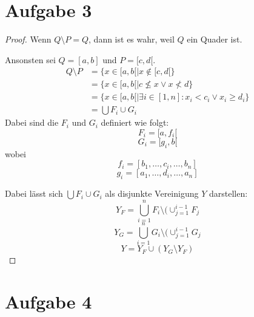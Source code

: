 \documentclass[10pt,a4paper]{article}
\begin{document}
\section{Aufgabe 3}
\begin{proof}
  Wenn $Q \setminus P = Q$, dann ist es wahr, weil $Q$ ein Quader ist.

  Ansonsten sei $Q = [a, b]$ und $P = [c, d[$.
  \begin{align*}
    Q \setminus P & = \{ x \in [a, b[ \mid x \notin [c, d[ \}\\
    & = \{ x \in [a, b[ \mid c \nleq x \lor x \nless d \}\\
    & = \{ x \in [a, b[ \mid \exists i \in [1, n]: x_{i} < c_{i} \lor x_{i} \geq d_{i} \}\\
    & = \bigcup F_{i} \cup G_{i}
  \end{align*}
  Dabei sind die $F_{i}$ und $G_{i}$ definiert wie folgt:
  \begin{equation}
    F_{i} = [a, f_{i}[
  \end{equation}
  \begin{equation}
    G_{i} = [g_{i}, b[
  \end{equation}
  wobei
  \begin{equation}
    f_{i} = [b_{1}, \dots, c_{i}, \dots, b_{n}]
  \end{equation}
  \begin{equation}
    g_{i} = [a_{1}, \dots, d_{i}, \dots, a_{n}]
  \end{equation}
  
  Dabei lässt sich $\bigcup F_{i} \cup G_{i}$ als disjunkte Vereinigung $Y$ darstellen:
  \begin{equation}
    Y_{F} = \bigcup_{i = 1}^{n} F_{i} \setminus (\cup_{j = 1}^{i - 1} F_{j}
  \end{equation}
  \begin{equation}
    Y_{G} = \bigcup_{i = 1}^{n} G_{i} \setminus (\cup_{j = 1}^{i - 1} G_{j}
  \end{equation}
  \begin{equation}
    Y = Y_{F} \cup (Y_{G} \setminus Y_{F})
  \end{equation}
\end{proof}

\section{Aufgabe 4}
\end{document}
